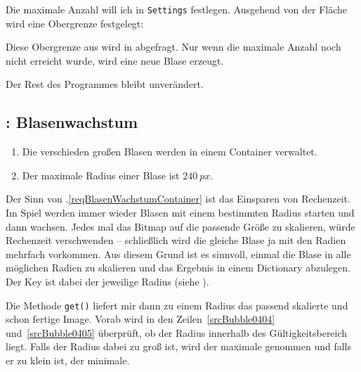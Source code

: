 Die maximale Anzahl will ich in \texttt{Settings} festlegen. Ausgehend von der Fläche wird eine Obergrenze festgelegt:


Diese Obergrenze aus  wird in  abgefragt. Nur wenn die maximale Anzahl noch nicht erreicht wurde, wird eine neue Blase erzeugt.



Der Rest des Programmes bleibt unverändert.

\subsection{: Blasenwachstum}
	\begin{enumerate}
		\item Die verschieden großen Blasen werden in einem Container verwaltet.\label{reqBlasenWachstumContainer}
		
		\item Der maximale Radius einer Blase ist $240~px$.\label{reqBlasenWachstumMax}
	\end{enumerate}
\er

Der Sinn von .\ref{reqBlasenWachstumContainer} ist das Einsparen von Rechenzeit. Im Spiel werden immer wieder Blasen mit einem bestimmten Radius starten und dann wachsen. Jedes mal das Bitmap auf die passende Größe zu skalieren, würde Rechenzeit verschwenden -- schließlich wird die gleiche Blase ja mit den Radien mehrfach vorkommen. Aus diesem Grund ist es sinnvoll, einmal die Blase in alle möglichen Radien zu skalieren und das Ergebnis in einem Dictionary abzulegen. Der Key ist dabei der jeweilige Radius (siehe ).

Die Methode \texttt{get()} liefert mir dann zu einem Radius das passend skalierte und schon fertige Image. Vorab wird in den Zeilen~\ref{srcBubble0404} und~\ref{srcBubble0405} überprüft, ob der Radius innerhalb des Gültigkeitsbereich liegt. Falls der Radius dabei zu groß ist, wird der maximale genommen und falls er zu klein ist, der minimale.

